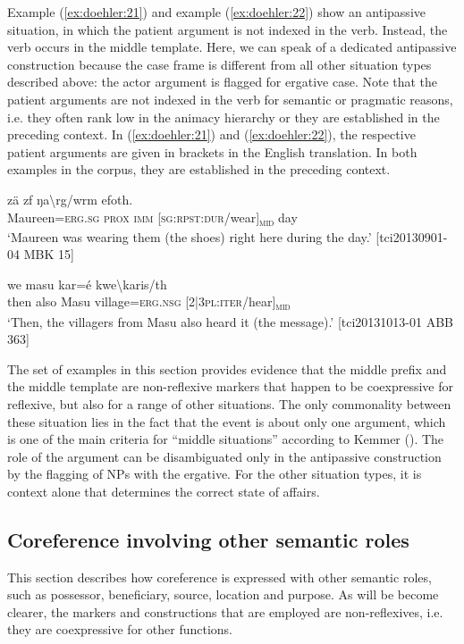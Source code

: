 \documentclass[output=paper]{langscibook}
\begin{document}
Example (\ref{ex:doehler:21}) and example (\ref{ex:doehler:22}) show an antipassive situation, in which the patient argument is not indexed in the verb. Instead, the verb occurs in the middle template. Here, we can speak of a dedicated antipassive construction because the case frame is different from all other situation types described above: the actor argument is flagged for ergative case. Note that the patient arguments are not indexed in the verb for semantic or pragmatic reasons, i.e. they often rank low in the animacy hierarchy or they are established in the preceding context. In (\ref{ex:doehler:21}) and (\ref{ex:doehler:22}), the respective patient arguments are given in brackets in the English translation. In both examples in the corpus, they are established in the preceding context.


\ea
	 {zä} {zf} {ŋa\textbackslash{rg}/wrm} {efoth}.\\
	Maureen=\textsc{erg}.\textsc{sg}{} \textsc{prox}{} \textsc{imm}{} [\textsc{sg}:\textsc{rpst}:\textsc{dur}/wear]\textsubscript{\textsc{mid}} day\\
	\glt `Maureen was wearing them (the shoes) right here during the day.' 
	[tci20130901-04 MBK 15]
	\label{ex:doehler:21}
\z

\ea
	 {we} {masu} {kar=é} {kwe\textbackslash{karis}/th}\\
	then also Masu village=\textsc{erg}.\textsc{nsg}{} [2|3\textsc{pl}:\textsc{iter}/hear]\textsubscript{\textsc{mid}}\\
	\glt `Then, the villagers from Masu also heard it (the message).' [tci20131013-01 ABB 363]\\
	\label{ex:doehler:22}
\z


The set of examples in this section provides evidence that the middle prefix and the middle template are non-reflexive markers that happen to be coexpressive for reflexive, but also for a range of other situations. The only commonality between these situation lies in the fact that the event is about only one argument, which is one of the main criteria for ``middle situations'' according to Kemmer (\citeyear{Kemmer1993}). The role of the argument can be disambiguated only in the antipassive construction by the flagging of NPs with the ergative. For the other situation types, it is context alone that determines the correct state of affairs.
\subsection{Coreference involving other semantic roles}\label{reflxexp-other}
This section describes how coreference is expressed with other semantic roles, such as possessor, beneficiary, source, location and purpose. As will be become clearer, the markers and constructions that are employed are non-reflexives, i.e. they are coexpressive for other functions.
\end{document}
